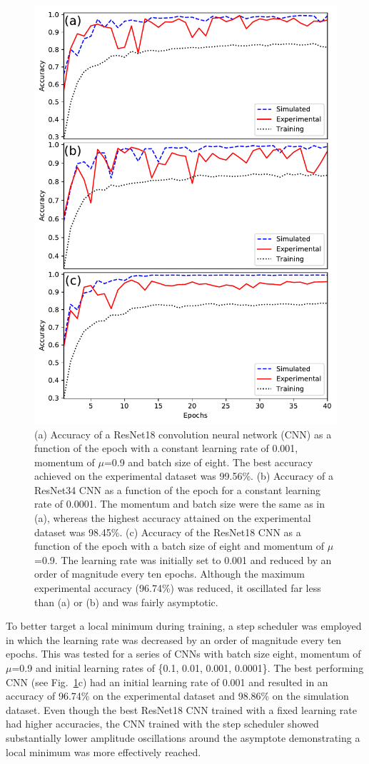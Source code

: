 \documentclass[10pt,journal,compsoc]{IEEEtran}
\begin{document}
\begin{figure}%
\centering %
\includegraphics[width=.5\textwidth]{results.pdf} %
\caption[Table of Contents Figure Caption]{(a) Accuracy of a ResNet18 convolution neural network (CNN) as a function of the epoch with a constant learning rate of 0.001, momentum of $\mu$=0.9 and batch size of eight. The best accuracy achieved on the experimental dataset was 99.56\%. (b) Accuracy of a ResNet34 CNN as a function of the epoch for a constant learning rate of 0.0001. The momentum and batch size were the same as in (a), whereas the highest accuracy attained on the experimental dataset was 98.45\%. (c) Accuracy of the ResNet18 CNN as a function of the epoch with a batch size of eight and momentum of $\mu$=0.9. The learning rate was initially set to 0.001 and reduced by an order of magnitude every ten epochs. Although the maximum experimental accuracy (96.74\%) was reduced, it oscillated far less than (a) or (b) and was fairly asymptotic.} %
\label{fig:results} %
\end{figure}

To better target a local minimum during training, a step scheduler was employed in which the learning rate was decreased by an order of magnitude every ten epochs. This was tested for a series of CNNs with batch size eight, momentum of $\mu$=0.9 and initial learning rates of \{0.1, 0.01, 0.001, 0.0001\}. The best performing CNN (see Fig.~\ref{fig:results}c) had an initial learning rate of 0.001 and resulted in an accuracy of 96.74\% on the experimental dataset and 98.86\% on the simulation dataset. Even though the best ResNet18 CNN trained with a fixed learning rate had higher accuracies, the CNN trained with the step scheduler showed substantially lower amplitude oscillations around the asymptote demonstrating a local minimum was more effectively reached.
\end{document}

